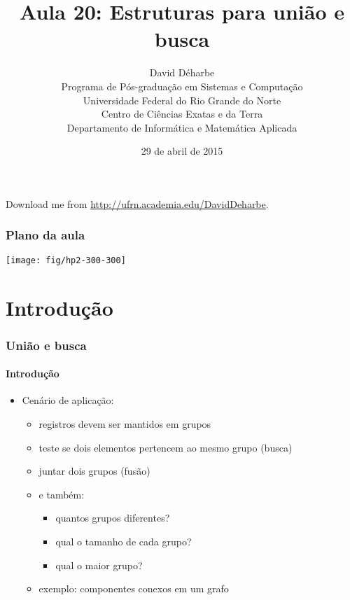 \documentclass{beamer}
\title{Aula 20: Estruturas para união e busca}
\author{David Déharbe \\
  Programa de Pós-graduação em Sistemas e Computação \\
  Universidade Federal do Rio Grande do Norte \\
  Centro de Ciências Exatas e da Terra \\
  Departamento de Informática e Matemática Aplicada}
\date{29 de abril de 2015}
\begin{document}
\begin{frame}
  \titlepage
  Download me from \url{http://ufrn.academia.edu/DavidDeharbe}.
\end{frame}

\begin{frame}
  \frametitle{Plano da aula}

\begin{center}
  \texttt{[image: fig/hp2-300-300]}
\end{center}

  \tableofcontents

\end{frame}

\section{Introdução}

\begin{frame}

  \frametitle{União e busca}
  \framesubtitle{Introdução}

  
  \begin{itemize}
    
  \item Cenário de aplicação:

    \begin{itemize}

      \item registros devem ser mantidos em grupos

      \item teste se dois elementos pertencem ao mesmo grupo (\alert{busca})

      \item juntar dois grupos (\alert{fusão})

      \item e também: 

        \begin{itemize}

          \item quantos grupos diferentes? 

          \item qual o tamanho de cada grupo?

          \item qual o maior grupo? 

        \end{itemize}

      \item exemplo: componentes conexos em um grafo

    \end{itemize}

\end{itemize}

\end{frame}
\end{document}
